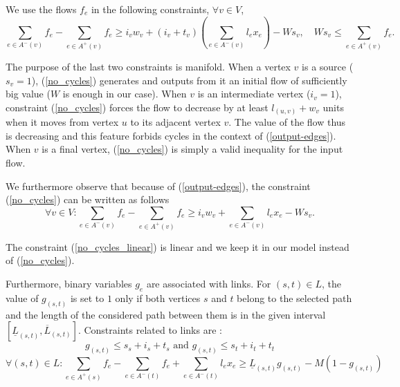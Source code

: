 \documentclass{endmH}
\newcommand{\forLaterVersions}[1]{}
\begin{document}
 We use the flows $f_e$ in the following constraints, $\forall v\in V$,
         \begin{equation}\label{no_cycles}
  \sum_{e\in A^{-}(v)} \!\!f_e  -  \!\!\sum_{e\in A^{+}(v)} \!\!f_e   \geq    i_v w_v + (i_v + t_v) ( \!\!\sum_{e\in A^{-}(v)} \!\!l_e x_e) - W s_v, %
\quad
    W s_v \leq    \!\!\sum_{e\in A^{+}(v)} \!\!f_e. %
    \end{equation}

    
The purpose of the last  two constraints is manifold.  When a vertex $v$ is a source ($s_v=1$), (\ref{no_cycles}) \forLaterVersions{and (\ref{initial_flow})} generates and outputs from it an initial flow of sufficiently big value ($W$ is enough in our case). When $v$ is an intermediate vertex  ($i_v=1$), constraint (\ref{no_cycles}) forces the flow to decrease by at least $l_{(u,v)}+w_v$  units when it moves from vertex $u$ to its adjacent vertex $v$. The value of the flow thus is decreasing and this feature forbids cycles in the context of (\ref{output-edges}).  When $v$ is  a final vertex, (\ref{no_cycles}) is simply a valid inequality for the input flow.%
  
    
We furthermore observe that because of (\ref{output-edges}), the constraint   (\ref{no_cycles}) can be written as follows 
             \begin{equation}\label{no_cycles_linear}
      \forall v\in V:\sum_{e\in A^{-}(v)} f_e  -  \sum_{e\in A^{+}(v)} f_e   \geq    i_v w_v +   \sum_{e\in A^{-}(v)} l_e x_e - W s_v. %
             \end{equation}
             
The constraint  (\ref{no_cycles_linear}) is  linear and we keep it in our model instead of  (\ref{no_cycles}).       


Furthermore, binary variables $g_e$ are associated with links. For $(s,t) \in L$, the value of $g_{(s,t)}$ is set to  $1$ only if  both vertices $s$ and $t$ belong to the selected path and the length of the considered path between them is in the given interval  $[\underline{L}_{(s,t)},\overline{L}_{(s,t)}]$. Constraints related to links are :
%
 \begin{equation}\label{gst_left}
 g_{(s,t)} \leq s_s+i_s+t_s \mbox{ and }  g_{(s,t)} \leq s_t+i_t+t_t
       \end{equation}
  \begin{equation}\label{lbound}
  \forall (s,t) \in L: 
  \sum_{e\in A^{+}(s)} f_e - \sum_{e\in A^{-}(t)} f_e  +  \sum_{e\in A^{-}(t)} l_e x_e \geq   \underline{L}_{(s,t)} g_{(s,t)} - M (1-g_{(s,t)})
       \end{equation}
       
\end{document}
